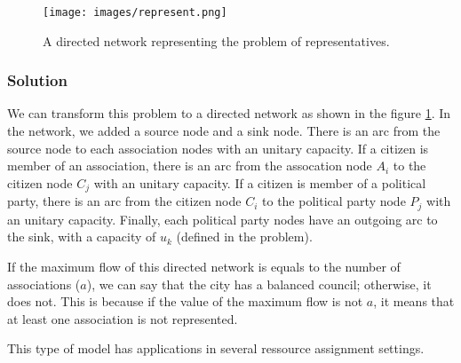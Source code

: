 \begin{figure}[H]
\centering
\texttt{[image: images/represent.png]}
\caption{A directed network representing the problem of representatives.}
\label{img:represent}
\end{figure}

\subsubsection{Solution}

We can transform this problem to a directed network as shown in the figure \ref{img:represent}. In the network, we added a source node and a sink node. There is an arc from the source node to each association nodes with an unitary capacity. If a citizen is member of an association, there is an arc from the assocation node $A_i$ to the citizen node $C_j$ with an unitary capacity. If a citizen is member of a political party, there is an arc from the citizen node $C_i$ to the political party node $P_j$ with an unitary capacity. Finally, each political party nodes have an outgoing arc to the sink, with a capacity of $u_k$ (defined in the problem).

If the maximum flow of this directed network is equals to the number of associations ($a$), we can say that the city has a balanced council; otherwise, it does not. This is because if the value of the maximum flow is not $a$, it means that at least one association is not represented.

This type of model has applications in several ressource assignment settings.



